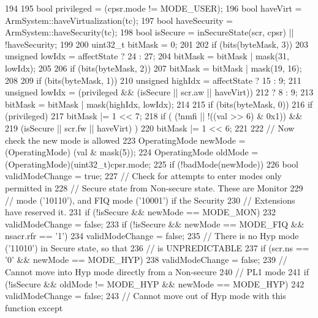 \begin{DoxyCode}
194     {
195         bool privileged   = (cpsr.mode != MODE_USER);
196         bool haveVirt     = ArmSystem::haveVirtualization(tc);
197         bool haveSecurity = ArmSystem::haveSecurity(tc);
198         bool isSecure     = inSecureState(scr, cpsr) || !haveSecurity;
199 
200         uint32_t bitMask = 0;
201 
202         if (bits(byteMask, 3)) {
203             unsigned lowIdx = affectState ? 24 : 27;
204             bitMask = bitMask | mask(31, lowIdx);
205         }
206         if (bits(byteMask, 2)) {
207             bitMask = bitMask | mask(19, 16);
208         }
209         if (bits(byteMask, 1)) {
210             unsigned highIdx = affectState ? 15 : 9;
211             unsigned lowIdx = (privileged && (isSecure || scr.aw || haveVirt))
212                             ? 8 : 9;
213             bitMask = bitMask | mask(highIdx, lowIdx);
214         }
215         if (bits(byteMask, 0)) {
216             if (privileged) {
217                 bitMask |= 1 << 7;
218                 if ( (!nmfi || !((val >> 6) & 0x1)) &&
219                      (isSecure || scr.fw || haveVirt) ) {
220                     bitMask |= 1 << 6;
221                 }
222                 // Now check the new mode is allowed
223                 OperatingMode newMode = (OperatingMode) (val & mask(5));
224                 OperatingMode oldMode = (OperatingMode)(uint32_t)cpsr.mode;
225                 if (!badMode(newMode)) {
226                     bool validModeChange = true;
227                     // Check for attempts to enter modes only permitted in
228                     // Secure state from Non-secure state. These are Monitor
229                     // mode ('10110'), and FIQ mode ('10001') if the Security
230                     // Extensions have reserved it.
231                     if (!isSecure && newMode == MODE_MON)
232                         validModeChange = false;
233                     if (!isSecure && newMode == MODE_FIQ && nsacr.rfr == '1')
234                         validModeChange = false;
235                     // There is no Hyp mode ('11010') in Secure state, so that
236                     // is UNPREDICTABLE
237                     if (scr.ns == '0' && newMode == MODE_HYP)
238                         validModeChange = false;
239                     // Cannot move into Hyp mode directly from a Non-secure
240                     // PL1 mode
241                     if (!isSecure && oldMode != MODE_HYP && newMode == MODE_HYP)
242                         validModeChange = false;
243                     // Cannot move out of Hyp mode with this function except
}}}}
\end{DoxyCode}
